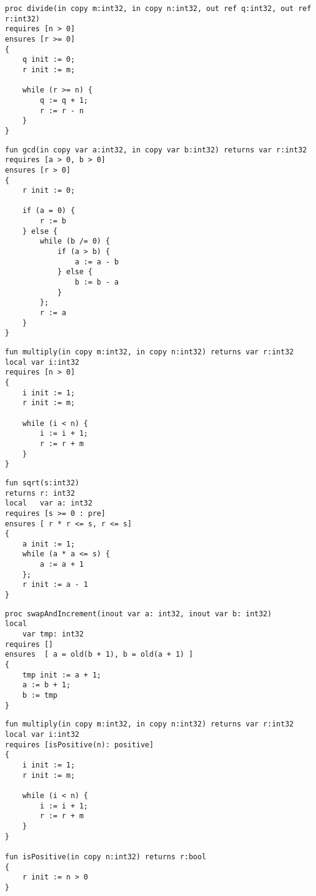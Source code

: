 
\begin{lstlisting}[caption=Pre-/postconditions in Prozeduren]
proc divide(in copy m:int32, in copy n:int32, out ref q:int32, out ref r:int32)
requires [n > 0]
ensures [r >= 0]
{
    q init := 0;
    r init := m;

    while (r >= n) {
        q := q + 1;
        r := r - n
    }
}
\end{lstlisting}

\begin{lstlisting}[caption=Pre-/postconditions in Funktionen mit mehreren Conditions]
fun gcd(in copy var a:int32, in copy var b:int32) returns var r:int32
requires [a > 0, b > 0]
ensures [r > 0]
{
    r init := 0;
    
    if (a = 0) {
        r := b
    } else {
        while (b /= 0) {
            if (a > b) {
                a := a - b
            } else {
                b := b - a
            }
        };
        r := a
    }
}
\end{lstlisting}

\begin{lstlisting}[caption=Pre-/postconditions in Funktionen]
fun multiply(in copy m:int32, in copy n:int32) returns var r:int32
local var i:int32
requires [n > 0]
{
    i init := 1;
    r init := m;

    while (i < n) {
        i := i + 1;
        r := r + m
    }
}
\end{lstlisting}

\begin{lstlisting}[caption=Berechnen einer ganzzahligen Quadratwurzel. Verwendung mehrerer Conditions]
fun sqrt(s:int32)
returns r: int32
local   var a: int32
requires [s >= 0 : pre]
ensures [ r * r <= s, r <= s]
{
    a init := 1;
    while (a * a <= s) {
        a := a + 1
    };      
    r init := a - 1
}
\end{lstlisting}

\begin{lstlisting}[caption=Evaluieren einer Expression im preexecution State]
proc swapAndIncrement(inout var a: int32, inout var b: int32)
local 
    var tmp: int32
requires []
ensures  [ a = old(b + 1), b = old(a + 1) ]
{
    tmp init := a + 1;
    a := b + 1;
    b := tmp
}
\end{lstlisting}

\begin{lstlisting}[caption=Pre-/postconditions mit Funktion in der Condition List]
fun multiply(in copy m:int32, in copy n:int32) returns var r:int32
local var i:int32
requires [isPositive(n): positive]
{
    i init := 1;
    r init := m;

    while (i < n) {
        i := i + 1;
        r := r + m
    }
}

fun isPositive(in copy n:int32) returns r:bool
{
    r init := n > 0
}
\end{lstlisting}

